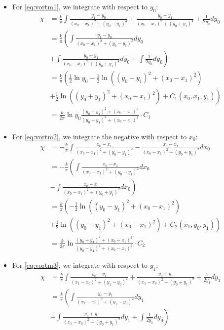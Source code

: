 \documentclass[10pt, a4paper]{article}
\numberwithin{equation}{section}
\newcommand{\inv}[1]{\frac{1}{#1}}
\newcommand{\half}{\frac{1}{2}}
\begin{document}
\begin{itemize}
\item For \cref{eq:vortm1}, we integrate with respect to $y_0$:
\begin{align}
\chi &=\frac{k}{\pi}\int \frac{y_1-y_0}{(x_0-x_1)^2 + (y_0-y_1)^2} + \frac{y_0+y_1}{(x_0-x_1)^2 +(y_0+y_1)^2} + \frac{1}{2y_0}dy_0\nonumber\\
&= \frac{k}{\pi} \left( \int  \frac{y_1-y_0}{(x_0-x_1)^2 + (y_0-y_1)^2} dy_0\right. \nonumber\\ &\left.+ \int \frac{y_0+y_1}{(x_0-x_1)^2 +(y_0+y_1)^2} dy_0 + \int \frac{1}{2y_0}dy_0\right)\nonumber\\
&= \frac{k}{\pi}\left(\inv{2} \ln y_0 -\half \ln((y_0-y_1)^2 +(x_0-x_1)^2)\right. \nonumber\\ &\left. + \half \ln((y_0+y_1)^2 +(x_0-x_1)^2) +C_1 (x_0,x_1,y_1)\right)\nonumber\\
&=\frac{k}{2\pi}\ln y_0 \frac{(y_0+y_1)^2 +(x_0-x_1)^2}{(y_0-y_1)^2 +(x_0-x_1)^2}\cdot C_1 \label{eq:chi1}
\end{align}
\item For \cref{eq:vortm2}, we integrate the negative with respect to $x_0$:
\begin{align}
\chi &=-\frac{k}{\pi}\int \frac{x_0-x_1}{(x_0-x_1)^2 + (y_0-y_1)^2} - \frac{x_0-x_1}{(x_0-x_1)^2 +(y_0+y_1)^2} dx_0\nonumber\\
&= -\frac{k}{\pi} \left( \int  \frac{x_0-x_1}{(x_0-x_1)^2 + (y_0-y_1)^2} dx_0\right. \nonumber\\ &\left.- \int \frac{x_0-x_1}{(x_0-x_1)^2 +(y_0+y_1)^2} dx_0 \right)\nonumber\\
&= \frac{k}{\pi}\left(-\half \ln((y_0-y_1)^2 +(x_0-x_1)^2)\right. \nonumber\\ &\left. + \half \ln((y_0+y_1)^2 +(x_0-x_1)^2) +C_2 (x_1,y_0,y_1)\right)\nonumber\\
&=\frac{k}{2\pi}\ln \frac{(y_0+y_1)^2 +(x_0-x_1)^2}{(y_0-y_1)^2 +(x_0-x_1)^2}\cdot C_2 \label{eq:chi2}
\end{align}
\item For \cref{eq:vortm3}, we integrate with respect to $y_1$:
\begin{align}
\chi &=\frac{k}{\pi}\int \frac{y_0-y_1}{(x_1-x_0)^2 + (y_1-y_0)^2} + \frac{y_0+y_1}{(x_1-x_0)^2 +(y_0+y_1)^2} + \frac{1}{2y_1}dy_1\nonumber\\
&= \frac{k}{\pi} \left( \int  \frac{y_0-y_1}{(x_1-x_0)^2 + (y_1-y_0)^2} dy_1\right. \nonumber\\ &\left.+ \int \frac{y_0+y_1}{(x_1-x_0)^2 +(y_0+y_1)^2} dy_1 + \int \frac{1}{2y_1}dy_0\right)\nonumber\\

\end{align}
\end{itemize}
\end{document}
